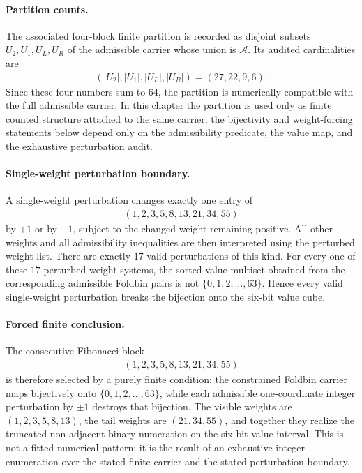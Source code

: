 \paragraph{Partition counts.}
The associated four-block finite partition is recorded as disjoint subsets $U_2,U_1,U_L,U_R$ of the admissible carrier whose union is $\mathcal{A}$. Its audited cardinalities are
$$
\begin{aligned}
(|U_2|,|U_1|,|U_L|,|U_R|)=(27,22,9,6).
\end{aligned}
$$
Since these four numbers sum to $64$, the partition is numerically compatible with the full admissible carrier. In this chapter the partition is used only as finite counted structure attached to the same carrier; the bijectivity and weight-forcing statements below depend only on the admissibility predicate, the value map, and the exhaustive perturbation audit.

\paragraph{Single-weight perturbation boundary.}
A single-weight perturbation changes exactly one entry of
$$
\begin{aligned}
(1,2,3,5,8,13,21,34,55)
\end{aligned}
$$
by $+1$ or by $-1$, subject to the changed weight remaining positive. All other weights and all admissibility inequalities are then interpreted using the perturbed weight list. There are exactly $17$ valid perturbations of this kind. For every one of these $17$ perturbed weight systems, the sorted value multiset obtained from the corresponding admissible Foldbin pairs is not $\{0,1,2,\ldots,63\}$. Hence every valid single-weight perturbation breaks the bijection onto the six-bit value cube.

\paragraph{Forced finite conclusion.}
The consecutive Fibonacci block
$$
\begin{aligned}
(1,2,3,5,8,13,21,34,55)
\end{aligned}
$$
is therefore selected by a purely finite condition: the constrained Foldbin carrier maps bijectively onto $\{0,1,2,\ldots,63\}$, while each admissible one-coordinate integer perturbation by $\pm1$ destroys that bijection. The visible weights are $(1,2,3,5,8,13)$, the tail weights are $(21,34,55)$, and together they realize the truncated non-adjacent binary numeration on the six-bit value interval. This is not a fitted numerical pattern; it is the result of an exhaustive integer enumeration over the stated finite carrier and the stated perturbation boundary.

